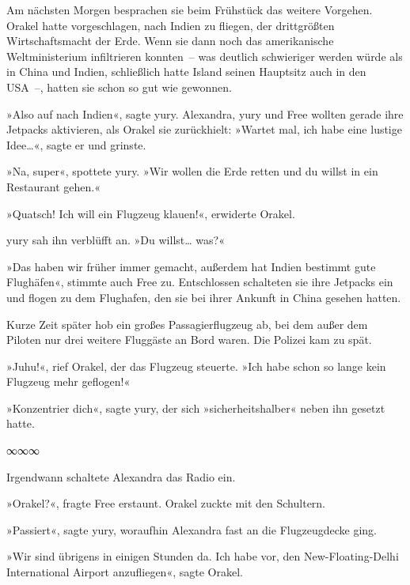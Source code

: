Am nächsten Morgen besprachen sie beim Frühstück das weitere Vorgehen. Orakel hatte vorgeschlagen, nach Indien zu fliegen, der drittgrößten Wirtschaftsmacht der Erde. Wenn sie dann noch das amerikanische Weltministerium infiltrieren konnten~– was deutlich schwieriger werden würde als in China und Indien, schließlich hatte Island seinen Hauptsitz auch in den USA~–, hatten sie schon so gut wie gewonnen.

»Also auf nach Indien«, sagte yury. Alexandra, yury und Free wollten gerade ihre Jetpacks aktivieren, als Orakel sie zurückhielt: »Wartet mal, ich habe eine lustige Idee…«, sagte er und grinste.

»Na, super«, spottete yury. »Wir wollen die Erde retten und du willst in ein Restaurant gehen.«

»Quatsch! Ich will ein Flugzeug klauen!«, erwiderte Orakel.

yury sah ihn verblüfft an. »Du willst… was?«

»Das haben wir früher immer gemacht, außerdem hat Indien bestimmt gute Flughäfen«, stimmte auch Free zu. Entschlossen schalteten sie ihre Jetpacks ein und flogen zu dem Flughafen, den sie bei ihrer Ankunft in China gesehen hatten.

Kurze Zeit später hob ein großes Passagierflugzeug ab, bei dem außer dem Piloten nur drei weitere Fluggäste an Bord waren. Die Polizei kam zu spät.

»Juhu!«, rief Orakel, der das Flugzeug steuerte. »Ich habe schon so lange kein Flugzeug mehr geflogen!«

»Konzentrier dich«, sagte yury, der sich »sicherheitshalber« neben ihn gesetzt hatte.

\begin{center}
    ∞∞∞
\end{center}

Irgendwann schaltete Alexandra das Radio ein.


»Orakel?«, fragte Free erstaunt. Orakel zuckte mit den Schultern.

»Passiert«, sagte yury, woraufhin Alexandra fast an die Flugzeugdecke ging.

»Wir sind übrigens in einigen Stunden da. Ich habe vor, den New-Floating-Delhi International Airport anzufliegen«, sagte Orakel.

